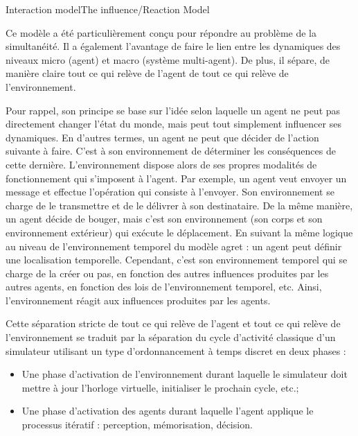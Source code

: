 \begin{frame}{Interaction model}{The influence/Reaction Model}
{\par Ce modèle a été particulièrement conçu pour répondre au problème de la simultanéité. Il a également l'avantage de faire le lien entre les dynamiques des niveaux micro (agent) et macro (système multi-agent). De plus, il sépare, de manière claire tout ce qui relève de l'agent de tout ce qui relève de l'environnement.
\par Pour rappel, son principe se base sur l'idée selon laquelle un agent ne peut pas directement changer l'état du monde, mais peut tout simplement influencer ses dynamiques. En d'autres termes, un agent ne peut que décider de l'action suivante à faire. C'est à son environnement de déterminer les conséquences de cette dernière. L'environnement dispose alors de ses propres modalités de fonctionnement qui s'imposent à l'agent.
Par exemple, un agent veut envoyer un message et effectue l'opération qui consiste à l'envoyer. Son environnement se charge de le transmettre et de le délivrer à son destinataire. De la même manière, un agent décide de bouger, mais c'est son environnement (son corps et son environnement extérieur) qui exécute le déplacement. En suivant la même logique au niveau de l'environnement temporel du modèle \gls{agret} : un agent peut définir une localisation temporelle. Cependant,  c'est son environnement temporel qui se charge de la créer ou pas, en fonction des autres influences produites par les autres agents, en fonction des lois de l'environnement temporel, etc. Ainsi, l'environnement réagit aux influences produites par les agents. 
\par Cette séparation stricte de tout ce qui relève de l'agent et tout ce qui relève de l'environnement se traduit par la séparation du cycle d'activité classique d'un simulateur utilisant un type d'ordonnancement à temps discret en deux phases : 
\begin{itemize}
   \item Une phase d’activation de l’environnement durant laquelle le simulateur doit mettre à jour l’horloge virtuelle, initialiser le prochain cycle, etc.;
    \item Une phase d'activation des agents durant laquelle l'agent applique le processus itératif : perception, mémorisation, décision. 
\end{itemize}
}
    
\end{frame}

